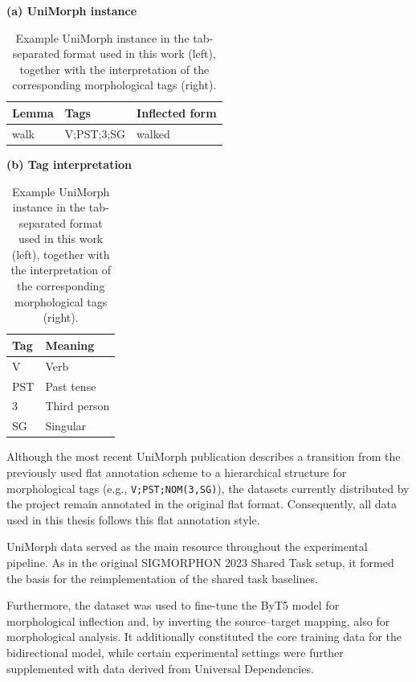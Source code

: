 \begin{table}[h]
\centering
\small
\begin{minipage}[t]{0.52\textwidth}
\centering
\textbf{(a) UniMorph instance}\\[0.25em]
\begin{tabular}{lll}
\toprule
Lemma & Tags & Inflected form \\
\midrule
walk & V;PST;3;SG & walked \\
\bottomrule
\end{tabular}
\end{minipage}
\hfill
\begin{minipage}[t]{0.43\textwidth}
\centering
\textbf{(b) Tag interpretation}\\[0.25em]
\begin{tabular}{ll}
\toprule
Tag & Meaning \\
\midrule
V & Verb \\
PST & Past tense \\
3 & Third person \\
SG & Singular \\
\bottomrule
\end{tabular}
\end{minipage}
\caption{Example UniMorph instance in the tab-separated format used in this work (left), together with the interpretation of the corresponding morphological tags (right).}
\label{tab:unimorph-example}
\end{table}

Although the most recent UniMorph publication describes a transition from the previously used flat annotation scheme to a hierarchical structure for morphological tags (e.g., \texttt{V;PST;NOM(3,SG)}), the datasets currently distributed by the project remain annotated in the original flat format. Consequently, all data used in this thesis follows this flat annotation style.

UniMorph data served as the main resource throughout the experimental pipeline. As in the original SIGMORPHON 2023 Shared Task setup, it formed the basis for the reimplementation of the shared task baselines.

Furthermore, the dataset was used to fine-tune the ByT5 model for morphological inflection and, by inverting the source–target mapping, also for morphological analysis. It additionally constituted the core training data for the bidirectional model, while certain experimental settings were further supplemented with data derived from Universal Dependencies.

